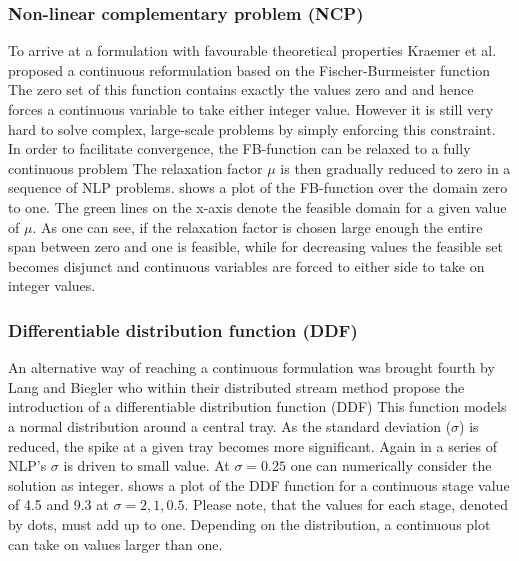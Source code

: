         \subsubsection{Non-linear complementary problem (NCP)}
        To arrive at a formulation with favourable theoretical properties Kraemer et al. \cite{Kraemer.2009} proposed
        a continuous reformulation based on the Fischer-Burmeister function
        The zero set of this function contains exactly the values zero and and hence forces a continuous variable to
        take either integer value. However it is still very hard to solve complex, large-scale problems by simply
        enforcing this constraint. In order to facilitate convergence, the FB-function can be relaxed to a fully
        continuous problem
        The relaxation factor $\mu$ is then gradually reduced to zero in a sequence of NLP problems. 
        shows a plot of the FB-function over the domain zero to one. The green lines on the x-axis denote the feasible domain
        for a given value of $\mu$. As one can see, if the relaxation factor is chosen large enough the entire span
        between zero and one is feasible, while for decreasing values the feasible set becomes disjunct and continuous
        variables are forced to either side to take on integer values.

        \subsubsection{Differentiable distribution function (DDF)}
        An alternative way of reaching a continuous formulation was brought fourth by Lang and Biegler \cite{Lang.2002}
        who within their distributed stream method propose the introduction of a differentiable distribution function (DDF)
        This function models a normal distribution around a central tray. As the standard deviation ($\sigma$) is reduced,
        the spike at a given tray becomes more significant. Again in a series of NLP's $\sigma$ is driven to small value.
        At $\sigma = 0.25$ one can numerically consider the solution as integer.  shows a plot
        of the DDF function for a continuous stage value of 4.5 and 9.3 at $\sigma = 2, 1, 0.5$. Please note, that the
        values for each stage, denoted by dots, must add up to one. Depending on the distribution, a continuous plot can take
        on values larger than one.
